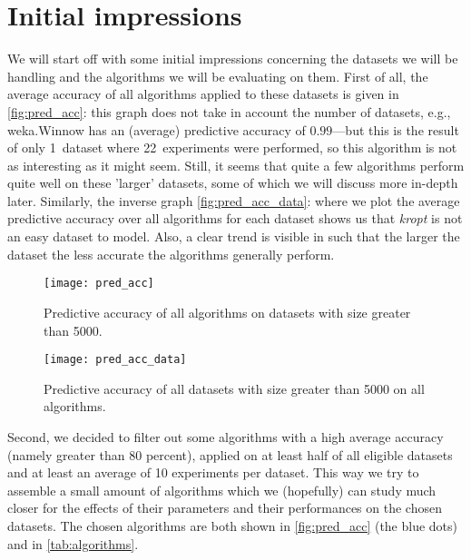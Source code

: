 \documentclass[a4paper,10pt,english]{scrartcl}
\newcommand{\dataset}[1]{\emph{#1}}
\begin{document}
\section{Initial impressions}
We will start off with some initial impressions concerning the datasets we will be handling and the algorithms we will be evaluating on them.
First of all, the average accuracy of all algorithms applied to these datasets is given in \autoref{fig:pred_acc}: this graph does not take in account the number of datasets, e.g., weka.Winnow has an (average) predictive accuracy of $0.99$---but this is the result of only 1~dataset where 22~experiments were performed, so this algorithm is not as interesting as it might seem. Still, it seems that quite a few algorithms perform quite well on these 'larger' datasets, some of which we will discuss more in-depth later. Similarly, the inverse graph \autoref{fig:pred_acc_data}: where we plot the average predictive accuracy over all algorithms for each dataset shows us that \dataset{kropt} is not an easy dataset to model. Also, a clear trend is visible in such that the larger the dataset the less accurate the algorithms generally perform.
\begin{figure}[hbpt]
\centering
\texttt{[image: pred\_acc]}
\caption{Predictive accuracy of all algorithms on datasets with size greater than 5000.}
\label{fig:pred_acc}
\end{figure}
\begin{figure}[hbpt]
\centering
\texttt{[image: pred\_acc\_data]}
\caption{Predictive accuracy of all datasets with size greater than 5000 on all algorithms.}
\label{fig:pred_acc_data}
\end{figure}

Second, we decided to filter out some algorithms with a high average accuracy (namely greater than 80 percent), applied on at least half of all eligible datasets and at least an average of 10 experiments per dataset. This way we try to assemble a small amount of algorithms which we (hopefully) can study much closer for the effects of their parameters and their performances on the chosen datasets. The chosen algorithms are both shown in \autoref{fig:pred_acc} (the blue dots) and in \autoref{tab:algorithms}.
\end{document}
